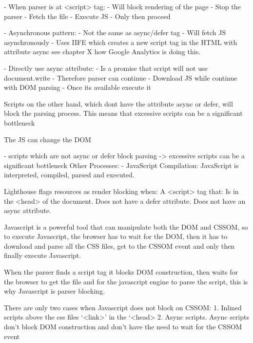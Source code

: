 - When parser is at <script> tag:
	- Will block rendering of the page
	- Stop the parser
	- Fetch the file
	- Execute JS
	- Only then proceed

- Asynchronous pattern:
	- Not the same as async/defer tag
	- Will fetch JS asynchronously
	- Uses IIFE which creates a new script tag in the HTML with attribute async
	see chapter X how Google Analytics is doing this.


- Directly use async attribute:
	- Is a promise that script will not use document.write
	- Therefore parser can continue
	- Download JS while continue with DOM parsing
	- Once its available execute it


Scripts on the other hand, which dont have the attribute async or defer, will block the parsing process.
This means that excessive scripts can be a significant bottleneck %


The JS can change the DOM %


- scripts which are not async or defer block parsing -> excessive scripts can be a significant bottleneck
Other Processes:
- JavaScript Compilation: JavaScript is interpreted, compiled, parsed and executed.


Lighthouse flags resources as render blocking when:
A <script> tag that:
Is in the <head> of the document.
Does not have a defer attribute.
Does not have an async attribute.


Javascript is a powerful tool that can manipulate both the DOM and CSSOM, so to execute Javascript, the browser has to wait for the DOM, then it has to download and parse all the CSS files, get to the CSSOM event and only then finally execute Javascript.

When the parser finds a script tag it blocks DOM construction, then waits for the browser to get the file and for the javascript engine to parse the script, this is why Javascript is parser blocking.

There are only two cases when Javascript does not block on CSSOM:
1. Inlined scripts above the css files ‘<link>’ in the ‘<head>
2. Async scripts.
Async scripts don’t block DOM construction and don’t have the need to wait for the CSSOM event




